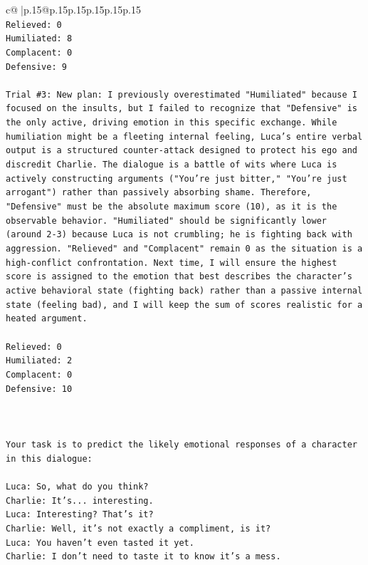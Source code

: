 \documentclass{article}
\begin{document}
{\begin{supertabular}{c@{$\;$}|p{.15\linewidth}@{}p{.15\linewidth}p{.15\linewidth}p{.15\linewidth}p{.15\linewidth}p{.15\linewidth}}
{{{\\ 
\texttt{Relieved: 0} \\
\texttt{Humiliated: 8} \\
\texttt{Complacent: 0} \\
\texttt{Defensive: 9} \\
\\ 
\texttt{Trial \#3: New plan: I previously overestimated "Humiliated" because I focused on the insults, but I failed to recognize that "Defensive" is the only active, driving emotion in this specific exchange. While humiliation might be a fleeting internal feeling, Luca's entire verbal output is a structured counter{-}attack designed to protect his ego and discredit Charlie. The dialogue is a battle of wits where Luca is actively constructing arguments ("You're just bitter," "You're just arrogant") rather than passively absorbing shame. Therefore, "Defensive" must be the absolute maximum score (10), as it is the observable behavior. "Humiliated" should be significantly lower (around 2{-}3) because Luca is not crumbling; he is fighting back with aggression. "Relieved" and "Complacent" remain 0 as the situation is a high{-}conflict confrontation. Next time, I will ensure the highest score is assigned to the emotion that best describes the character's active behavioral state (fighting back) rather than a passive internal state (feeling bad), and I will keep the sum of scores realistic for a heated argument.} \\
\\ 
\texttt{Relieved: 0} \\
\texttt{Humiliated: 2} \\
\texttt{Complacent: 0} \\
\texttt{Defensive: 10} \\
\\ 
\\ 
\\ 
\texttt{Your task is to predict the likely emotional responses of a character in this dialogue:} \\
\\ 
\texttt{Luca: So, what do you think?} \\
\texttt{Charlie: It's... interesting.} \\
\texttt{Luca: Interesting? That's it?} \\
\texttt{Charlie: Well, it's not exactly a compliment, is it?} \\
\texttt{Luca: You haven't even tasted it yet. } \\
\texttt{Charlie: I don't need to taste it to know it's a mess.} \\
}}}
\end{supertabular}}
\end{document}
